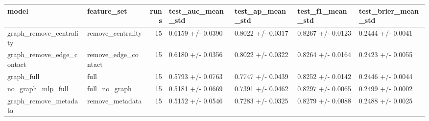 \begin{tabular}{llrllll}
\toprule
model & feature\_set & runs & test\_auc\_mean\_std & test\_ap\_mean\_std & test\_f1\_mean\_std & test\_brier\_mean\_std \\
\midrule
graph\_remove\_centrality & remove\_centrality & 15 & 0.6159 +/- 0.0390 & 0.8022 +/- 0.0317 & 0.8267 +/- 0.0123 & 0.2444 +/- 0.0041 \\
graph\_remove\_edge\_contact & remove\_edge\_contact & 15 & 0.6180 +/- 0.0356 & 0.8022 +/- 0.0322 & 0.8264 +/- 0.0164 & 0.2423 +/- 0.0055 \\
graph\_full & full & 15 & 0.5793 +/- 0.0763 & 0.7747 +/- 0.0439 & 0.8252 +/- 0.0142 & 0.2446 +/- 0.0044 \\
no\_graph\_mlp\_full & full\_no\_graph & 15 & 0.5181 +/- 0.0669 & 0.7391 +/- 0.0462 & 0.8297 +/- 0.0065 & 0.2499 +/- 0.0002 \\
graph\_remove\_metadata & remove\_metadata & 15 & 0.5152 +/- 0.0546 & 0.7283 +/- 0.0325 & 0.8279 +/- 0.0088 & 0.2488 +/- 0.0025 \\
\bottomrule
\end{tabular}
